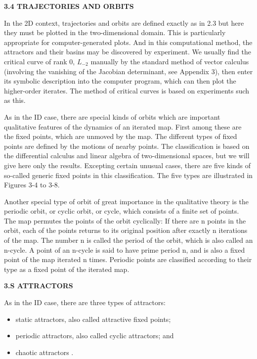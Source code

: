 \documentclass{article}
\begin{document}
\hfill

\textbf{3.4 TRAJECTORIES AND ORBITS}

\hfill

In the 2D context, trajectories and orbits are defined exactly as
in 2.3 but here they must be plotted in the two-dimensional domain.
This is particularly appropriate for computer-generated plots. And
in this computational method, the attractors and their basins may
be discovered by experiment. We usually find the critical curve of
rank 0, $L_{-2}$ manually by the standard method of vector calculus
(involving the vanishing of the Jacobian determinant, see Appendix
3), then enter its symbolic description into the computer program,
which can then plot the higher-order iterates. The method of critical
curves is based on experiments such as this.

As in the ID case, there are special kinds of orbits which are
important qualitative features of the dynamics of an iterated map.
First among these are the fixed points, which are unmoved by the
map. The different types of fixed points are defined by the motions
of nearby points. The classification is based on the differential calculus
and linear algebra of two-dimensional spaces, but we will
give here only the results. Excepting certain unusual cases, there are
five kinds of so-called generic fixed points in this classification. The
five types are illustrated in Figures 3-4 to 3-8.

Another special type of orbit of great importance in the qualitative
theory is the periodic orbit, or cyclic orbit, or cycle, which
consists of a finite set of points. The map permutes the points of the
orbit cyclically: If there are n points in the orbit, each of the points
returns to its original position after exactly n iterations of the map.
The number n is called the period of the orbit, which is also called
an n-cycle. A point of an n-cycle is said to have prime period n, and
is also a fixed point of the map iterated n times. Periodic points are
classified according to their type as a fixed point of the iterated
map.

\hfill

\textbf{3.S ATTRACTORS}

\hfill

As in the ID case, there are three types of attractors:

\begin{itemize}
\item static attractors, also called attractive fixed points;
\item periodic attractors, also called cyclic attractors; and
\item chaotic attractors .
\end{itemize}
\end{document}
